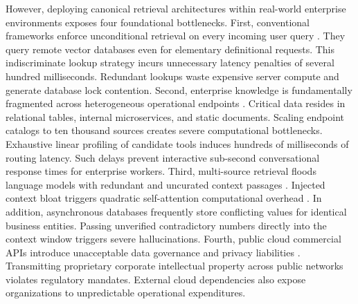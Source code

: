 \documentclass[fleqn,10pt]{article}
\begin{document}
However, deploying canonical retrieval architectures within real-world enterprise environments exposes four foundational bottlenecks. First, conventional frameworks enforce unconditional retrieval on every incoming user query \cite{karpukhin2020dpr}. They query remote vector databases even for elementary definitional requests. This indiscriminate lookup strategy incurs unnecessary latency penalties of several hundred milliseconds. Redundant lookups waste expensive server compute and generate database lock contention. Second, enterprise knowledge is fundamentally fragmented across heterogeneous operational endpoints \cite{thakur2021beir}. Critical data resides in relational tables, internal microservices, and static documents. Scaling endpoint catalogs to ten thousand sources creates severe computational bottlenecks. Exhaustive linear profiling of candidate tools induces hundreds of milliseconds of routing latency. Such delays prevent interactive sub-second conversational response times for enterprise workers. Third, multi-source retrieval floods language models with redundant and uncurated context passages \cite{liu2024lost_in_the_middle}. Injected context bloat triggers quadratic self-attention computational overhead \cite{vaswani2017attention,dao2022flashattention}. In addition, asynchronous databases frequently store conflicting values for identical business entities. Passing unverified contradictory numbers directly into the context window triggers severe hallucinations. Fourth, public cloud commercial APIs introduce unacceptable data governance and privacy liabilities \cite{voigt2017eu_gdpr}. Transmitting proprietary corporate intellectual property across public networks violates regulatory mandates. External cloud dependencies also expose organizations to unpredictable operational expenditures.
\end{document}
